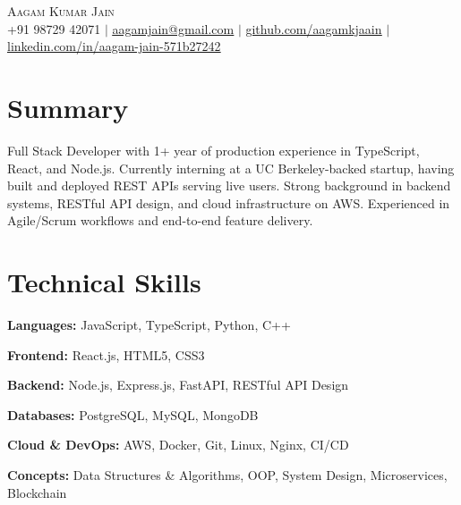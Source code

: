 \documentclass[letterpaper,10pt]{article}
\begin{document}
\begin{center}
    {\Huge \scshape Aagam Kumar Jain} \\ \vspace{3pt}
    \small
    +91 98729 42071 \hspace{2pt}$\vert$\hspace{2pt}
    \href{mailto:aagamjain@gmail.com}{\underline{aagamjain@gmail.com}} \hspace{2pt}$\vert$\hspace{2pt}
    \href{https://github.com/aagamkjaain}{\underline{github.com/aagamkjaain}} \hspace{2pt}$\vert$\hspace{2pt}
    \href{https://www.linkedin.com/in/aagam-jain-571b27242/}{\underline{linkedin.com/in/aagam-jain-571b27242}}
\end{center}

\section{Summary}
\vspace{1pt}
\small{Full Stack Developer with 1+ year of production experience in TypeScript, React, and Node.js. Currently interning at a UC Berkeley-backed startup, having built and deployed REST APIs serving live users. Strong background in backend systems, RESTful API design, and cloud infrastructure on AWS. Experienced in Agile/Scrum workflows and end-to-end feature delivery.}
\vspace{-6pt}


\section{Technical Skills}
\begin{itemize}[leftmargin=0.15in, label={}, itemsep=0pt, topsep=2pt]
  \small{
    \item \textbf{Languages:} JavaScript, TypeScript, Python, C++
    \item \textbf{Frontend:} React.js, HTML5, CSS3
    \item \textbf{Backend:} Node.js, Express.js, FastAPI, RESTful API Design
    \item \textbf{Databases:} PostgreSQL, MySQL, MongoDB
    \item \textbf{Cloud \& DevOps:} AWS, Docker, Git, Linux, Nginx, CI/CD
    \item \textbf{Concepts:} Data Structures \& Algorithms, OOP, System Design, Microservices, Blockchain
  }
\end{itemize}
\end{document}
